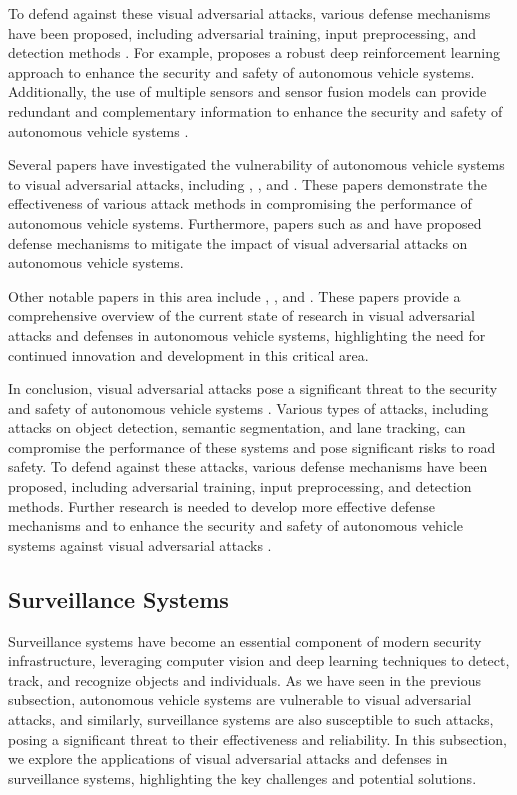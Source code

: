 \documentclass[11pt]{article}
\begin{document}
To defend against these visual adversarial attacks, various defense mechanisms have been proposed, including adversarial training, input preprocessing, and detection methods \cite{ref197}. For example, \cite{ref199} proposes a robust deep reinforcement learning approach to enhance the security and safety of autonomous vehicle systems. Additionally, the use of multiple sensors and sensor fusion models can provide redundant and complementary information to enhance the security and safety of autonomous vehicle systems \cite{ref200}.

Several papers have investigated the vulnerability of autonomous vehicle systems to visual adversarial attacks, including \cite{ref201}, \cite{ref202}, and \cite{ref203}. These papers demonstrate the effectiveness of various attack methods in compromising the performance of autonomous vehicle systems. Furthermore, papers such as \cite{ref204} and \cite{ref33} have proposed defense mechanisms to mitigate the impact of visual adversarial attacks on autonomous vehicle systems.

Other notable papers in this area include \cite{ref205}, \cite{ref206}, and \cite{ref207}. These papers provide a comprehensive overview of the current state of research in visual adversarial attacks and defenses in autonomous vehicle systems, highlighting the need for continued innovation and development in this critical area.

In conclusion, visual adversarial attacks pose a significant threat to the security and safety of autonomous vehicle systems \cite{ref196}. Various types of attacks, including attacks on object detection, semantic segmentation, and lane tracking, can compromise the performance of these systems and pose significant risks to road safety. To defend against these attacks, various defense mechanisms have been proposed, including adversarial training, input preprocessing, and detection methods. Further research is needed to develop more effective defense mechanisms and to enhance the security and safety of autonomous vehicle systems against visual adversarial attacks \cite{ref63}.

\subsection{Surveillance Systems}

Surveillance systems have become an essential component of modern security infrastructure, leveraging computer vision and deep learning techniques to detect, track, and recognize objects and individuals. As we have seen in the previous subsection, autonomous vehicle systems are vulnerable to visual adversarial attacks, and similarly, surveillance systems are also susceptible to such attacks, posing a significant threat to their effectiveness and reliability. In this subsection, we explore the applications of visual adversarial attacks and defenses in surveillance systems, highlighting the key challenges and potential solutions.
\end{document}
